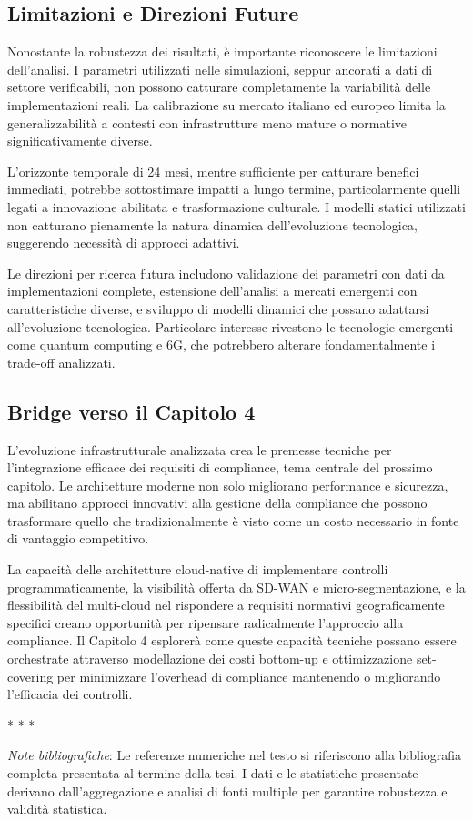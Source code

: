 \subsection{Limitazioni e Direzioni Future}

Nonostante la robustezza dei risultati, è importante riconoscere le limitazioni dell'analisi. I parametri utilizzati nelle simulazioni, seppur ancorati a dati di settore verificabili, non possono catturare completamente la variabilità delle implementazioni reali. La calibrazione su mercato italiano ed europeo limita la generalizzabilità a contesti con infrastrutture meno mature o normative significativamente diverse.

L'orizzonte temporale di 24 mesi, mentre sufficiente per catturare benefici immediati, potrebbe sottostimare impatti a lungo termine, particolarmente quelli legati a innovazione abilitata e trasformazione culturale. I modelli statici utilizzati non catturano pienamente la natura dinamica dell'evoluzione tecnologica, suggerendo necessità di approcci adattivi.

Le direzioni per ricerca futura includono validazione dei parametri con dati da implementazioni complete, estensione dell'analisi a mercati emergenti con caratteristiche diverse, e sviluppo di modelli dinamici che possano adattarsi all'evoluzione tecnologica. Particolare interesse rivestono le tecnologie emergenti come quantum computing e 6G, che potrebbero alterare fondamentalmente i trade-off analizzati.

\subsection{Bridge verso il Capitolo 4}

L'evoluzione infrastrutturale analizzata crea le premesse tecniche per l'integrazione efficace dei requisiti di compliance, tema centrale del prossimo capitolo. Le architetture moderne non solo migliorano performance e sicurezza, ma abilitano approcci innovativi alla gestione della compliance che possono trasformare quello che tradizionalmente è visto come un costo necessario in fonte di vantaggio competitivo.

La capacità delle architetture cloud-native di implementare controlli programmaticamente, la visibilità offerta da SD-WAN e micro-segmentazione, e la flessibilità del multi-cloud nel rispondere a requisiti normativi geograficamente specifici creano opportunità per ripensare radicalmente l'approccio alla compliance. Il Capitolo 4 esplorerà come queste capacità tecniche possano essere orchestrate attraverso modellazione dei costi bottom-up e ottimizzazione set-covering per minimizzare l'overhead di compliance mantenendo o migliorando l'efficacia dei controlli.

\begin{center}
* * *
\end{center}

\textit{Note bibliografiche}: Le referenze numeriche nel testo si riferiscono alla bibliografia completa presentata al termine della tesi. I dati e le statistiche presentate derivano dall'aggregazione e analisi di fonti multiple per garantire robustezza e validità statistica.